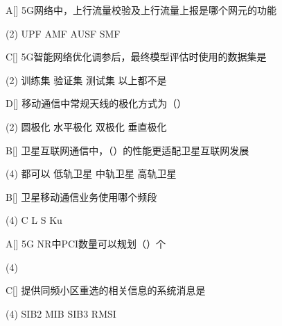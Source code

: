 \begin{choice}{A}[]
    5G网络中，上行流量校验及上行流量上报是哪个网元的功能
    \begin{tasks}(2)
        \task UPF
        \task AMF
        \task AUSF
        \task SMF
    \end{tasks}
\end{choice}


\begin{choice}{C}[]
    5G智能网络优化调参后，最终模型评估时使用的数据集是
    \begin{tasks}(2)
        \task 训练集
        \task 验证集
        \task 测试集
        \task 以上都不是
    \end{tasks}
\end{choice}


\begin{choice}{D}[]
    移动通信中常规天线的极化方式为（\quad）
    \begin{tasks}(2)
        \task 圆极化
        \task 水平极化
        \task 双极化
        \task 垂直极化
    \end{tasks}
\end{choice}

\begin{choice}{B}[]
    卫星互联网通信中，（\quad）的性能更适配卫星互联网发展
    \begin{tasks}(4)
        \task 都可以
        \task 低轨卫星
        \task 中轨卫星
        \task 高轨卫星
    \end{tasks}
\end{choice}

\begin{choice}{B}[]
    卫星移动通信业务使用哪个频段
    \begin{tasks}(4)
        \task C
        \task L
        \task S
        \task Ku
    \end{tasks}
\end{choice}



\begin{choice}{A}[]
    5G NR中PCI数量可以规划（\quad）个
    \begin{tasks}(4)
    \end{tasks}
\end{choice}

\begin{choice}{C}[]
    提供同频小区重选的相关信息的系统消息是
    \begin{tasks}(4)
        \task SIB2
        \task MIB
        \task SIB3
        \task RMSI
    \end{tasks}
\end{choice}


